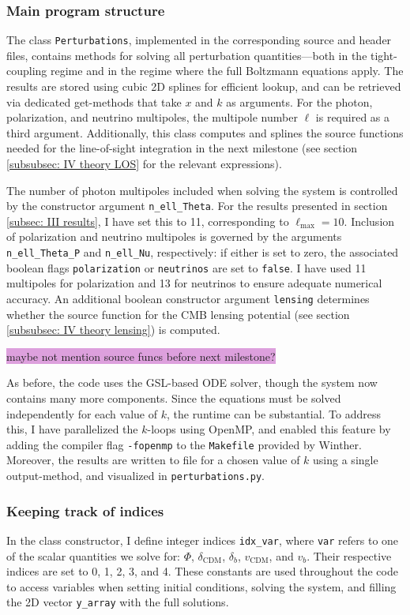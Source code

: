 \documentclass{aa}
\numberwithin{equation}{section}
\numberwithin{table}{section}
\numberwithin{figure}{section}
\begin{document}
\subsubsection{Main program structure}
The class \verb|Perturbations|, implemented in the corresponding source and header files, contains methods for solving all perturbation quantities—both in the tight-coupling regime and in the regime where the full Boltzmann equations apply. The results are stored using cubic 2D splines for efficient lookup, and can be retrieved via dedicated get-methods that take $x$ and $k$ as arguments. For the photon, polarization, and neutrino multipoles, the multipole number $\ell$ is required as a third argument. Additionally, this class computes and splines the source functions needed for the line-of-sight integration in the next milestone (see section \ref{subsubsec: IV theory LOS} for the relevant expressions).

The number of photon multipoles included when solving the system is controlled by the constructor argument \verb|n_ell_Theta|. For the results presented in section \ref{subsec: III results}, I have set this to 11, corresponding to $\ell_{\max} = 10$. Inclusion of polarization and neutrino multipoles is governed by the arguments \verb|n_ell_Theta_P| and \verb|n_ell_Nu|, respectively: if either is set to zero, the associated boolean flags \verb|polarization| or \verb|neutrinos| are set to \verb|false|. I have used 11 multipoles for polarization and 13 for neutrinos to ensure adequate numerical accuracy. An additional boolean constructor argument \verb|lensing| determines whether the source function for the CMB lensing potential (see section \ref{subsubsec: IV theory lensing}) is computed.

\colorbox{Plum}{maybe not mention source funcs before next milestone?}

As before, the code uses the GSL-based ODE solver, though the system now contains many more components. Since the equations must be solved independently for each value of $k$, the runtime can be substantial. To address this, I have parallelized the $k$-loops using OpenMP, and enabled this feature by adding the compiler flag \verb|-fopenmp| to the \verb|Makefile| provided by Winther. Moreover, the results are written to file for a chosen value of $k$ using a single output-method, and visualized in \verb|perturbations.py|. 


\subsubsection{Keeping track of indices}  
In the class constructor, I define integer indices \verb|idx_var|, where \verb|var| refers to one of the scalar quantities we solve for: $\Phi$, $\delta_\text{CDM}$, $\delta_b$, $v_\text{CDM}$, and $v_b$. Their respective indices are set to 0, 1, 2, 3, and 4. These constants are used throughout the code to access variables when setting initial conditions, solving the system, and filling the 2D vector \verb|y_array| with the full solutions.
\end{document}
